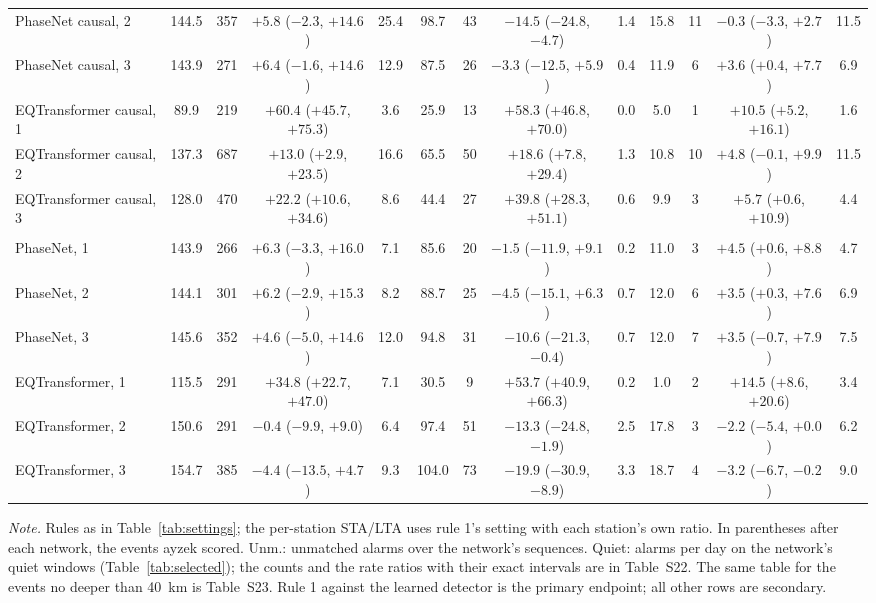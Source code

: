 \documentclass[a4paper,fleqn]{cas-sc}
\newcommand{\stalta}{STA/LTA}
\newcommand{\tablenote}[1]{\par\vspace{4pt}%
  \begin{minipage}{\linewidth}\footnotesize\textit{Note.} #1
\end{minipage}}
\begin{document}
\begin{table}[pos=htbp]
\begin{tabular}{@{}lcccccccccccc@{}}
    PhaseNet causal, 2 & 144.5 & 357 & $+5.8$ ($-2.3$, $+14.6$) & 25.4 & 98.7 & 43 & $-14.5$ ($-24.8$, $-4.7$) & 1.4 & 15.8 & 11 & $-0.3$ ($-3.3$, $+2.7$) & 11.5 \\
    PhaseNet causal, 3 & 143.9 & 271 & $+6.4$ ($-1.6$, $+14.6$) & 12.9 & 87.5 & 26 & $-3.3$ ($-12.5$, $+5.9$) & 0.4 & 11.9 & 6 & $+3.6$ ($+0.4$, $+7.7$) & 6.9 \\
    EQTransformer causal, 1 & 89.9 & 219 & $+60.4$ ($+45.7$, $+75.3$) & 3.6 & 25.9 & 13 & $+58.3$ ($+46.8$, $+70.0$) & 0.0 & 5.0 & 1 & $+10.5$ ($+5.2$, $+16.1$) & 1.6 \\
    EQTransformer causal, 2 & 137.3 & 687 & $+13.0$ ($+2.9$, $+23.5$) & 16.6 & 65.5 & 50 & $+18.6$ ($+7.8$, $+29.4$) & 1.3 & 10.8 & 10 & $+4.8$ ($-0.1$, $+9.9$) & 11.5 \\
    EQTransformer causal, 3 & 128.0 & 470 & $+22.2$ ($+10.6$, $+34.6$) & 8.6 & 44.4 & 27 & $+39.8$ ($+28.3$, $+51.1$) & 0.6 & 9.9 & 3 & $+5.7$ ($+0.6$, $+10.9$) & 4.4 \\
    \addlinespace
    \multicolumn{13}{@{}l}{\emph{Look-ahead, offline only}} \\
    PhaseNet, 1 & 143.9 & 266 & $+6.3$ ($-3.3$, $+16.0$) & 7.1 & 85.6 & 20 & $-1.5$ ($-11.9$, $+9.1$) & 0.2 & 11.0 & 3 & $+4.5$ ($+0.6$, $+8.8$) & 4.7 \\
    PhaseNet, 2 & 144.1 & 301 & $+6.2$ ($-2.9$, $+15.3$) & 8.2 & 88.7 & 25 & $-4.5$ ($-15.1$, $+6.3$) & 0.7 & 12.0 & 6 & $+3.5$ ($+0.3$, $+7.6$) & 6.9 \\
    PhaseNet, 3 & 145.6 & 352 & $+4.6$ ($-5.0$, $+14.6$) & 12.0 & 94.8 & 31 & $-10.6$ ($-21.3$, $-0.4$) & 0.7 & 12.0 & 7 & $+3.5$ ($-0.7$, $+7.9$) & 7.5 \\
    EQTransformer, 1 & 115.5 & 291 & $+34.8$ ($+22.7$, $+47.0$) & 7.1 & 30.5 & 9 & $+53.7$ ($+40.9$, $+66.3$) & 0.2 & 1.0 & 2 & $+14.5$ ($+8.6$, $+20.6$) & 3.4 \\
    EQTransformer, 2 & 150.6 & 291 & $-0.4$ ($-9.9$, $+9.0$) & 6.4 & 97.4 & 51 & $-13.3$ ($-24.8$, $-1.9$) & 2.5 & 17.8 & 3 & $-2.2$ ($-5.4$, $+0.0$) & 6.2 \\
    EQTransformer, 3 & 154.7 & 385 & $-4.4$ ($-13.5$, $+4.7$) & 9.3 & 104.0 & 73 & $-19.9$ ($-30.9$, $-8.9$) & 3.3 & 18.7 & 4 & $-3.2$ ($-6.7$, $-0.2$) & 9.0 \\
    \bottomrule
  \end{tabular}
  \tablenote{Rules as in Table~\ref{tab:settings}; the per-station \stalta{} uses rule
    1's setting with each station's own ratio. In parentheses after each network, the
    events ayzek scored. Unm.: unmatched alarms over the network's sequences. Quiet:
    alarms per day on the network's quiet windows (Table~\ref{tab:selected}); the
    counts and the rate ratios with their exact intervals are in Table~S22. The same
    table for the events no deeper than 40~km is Table~S23. Rule 1 against the learned
  detector is the primary endpoint; all other rows are secondary.}
\end{table}
\end{document}

